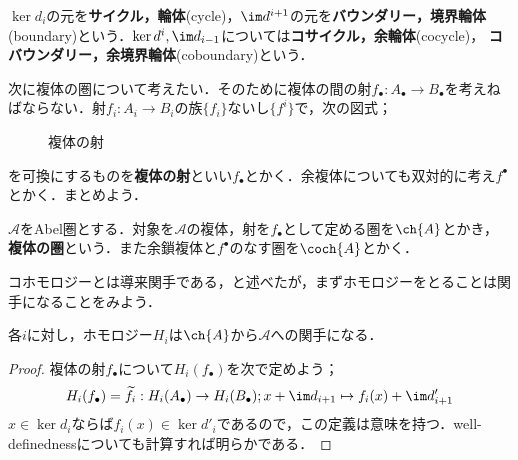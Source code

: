 \begin{defi}
	$\ker d_i$の元を\textbf{サイクル，輪体}(cycle)，$\im d^{i+1}$の元を\textbf{バウンダリー，境界輪体}(boundary)という．$\ker d^i,\im d_{i-1}$については\textbf{コサイクル，余輪体}(cocycle)， \textbf{コバウンダリー，余境界輪体}(coboundary)という．
\end{defi}

次に複体の圏について考えたい．そのために複体の間の射$f_\bullet:A_\bullet\to B_\bullet$を考えねばならない．射$f_i:A_i\to B_i$の族$\{f_i\}$ないし$\{f^i\}$で，次の図式；

	\begin{figure}[H]
		\centering
		\caption{複体の射}
	\end{figure}

を可換にするものを\textbf{複体の射}といい$f_\bullet$とかく．余複体についても双対的に考え$f^\bullet$とかく．まとめよう．
\begin{defi}[複体の圏]
	$\mathscr{A}$をAbel圏とする．対象を$\mathscr{A}$の複体，射を$f_\bullet$として定める圏を$\ch{A}$とかき， \textbf{複体の圏}という．また余鎖複体と$f^\bullet$のなす圏を$\coch{A}$とかく．
\end{defi}

コホモロジーとは導来関手である，と述べたが，まずホモロジーをとることは関手になることをみよう．
\begin{prop}
	各$i$に対し，ホモロジー$H_i$は$\ch{A}$から$\mathscr{A}$への関手になる．
\end{prop}
\begin{proof}
	複体の射$f_\bullet$について$H_i(f_\bullet)$を次で定めよう；
	\[H_i(f_\bullet)=\widetilde{f}_i:H_i(A_\bullet)\to H_i(B_\bullet);x+\im d_{i+1}\mapsto f_i(x)+\im d_{i+1}'\]
	$x\in\ker d_i$ならば$f_i(x)\in\ker d'_i$であるので，この定義は意味を持つ．well-definednessについても計算すれば明らかである．
\end{proof}


